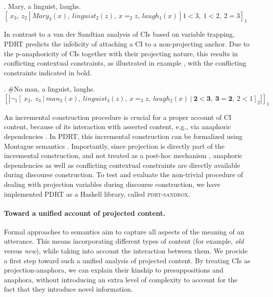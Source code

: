 \documentclass[letterpaper,11pt]{article}
\begin{document}
\vspace{-0.25cm}
\ex.  Mary, a linguist, laughs.\\
{\small 
  $[~x_3,~z_2~
   |~Mary_3(x),~linguist_2(z),~x=_2z,~laugh_1(x)~
 |~1 < 3,~1 < 2,~2=3]_1$
}

\vspace{-0.25cm}
\noindent In contrast to a van der Sandtian analysis of CIs
based on variable trapping, PDRT predicts the infelicity of attaching a CI
to a non-projecting anchor. Due to the p-anaphoricity of CIs together with
their projecting nature, this results in conflicting contextual constraints,
as illustrated in example \Next, with the conflicting constraints
indicated in bold.

\vspace{-0.25cm}
\ex. \#No man, a linguist, laughs.\\
{\small 
  $[|\neg_1[~x_2,~z_3~
   |~man_2(x),~linguist_3(z),~x=_3z,~laugh_2(x)~
   |{\mathbf{~2 < 3,~3 = 2}},~2 < 1]_2|]_1$
}

\vspace{-0.25cm} 
\noindent An incremental construction procedure is crucial
for a proper account of CI content, because of its interaction with asserted
content, e.g., via anaphoric dependencies \citep{anderbois2010crossing}.  In
PDRT, this incremental construction can be formalized using Montague
semantics \citep[cf.][]{muskens1996combining}.  Importantly, since
projection is directly part of the incremental construction, and not treated
as a post-hoc mechanism \citep[as in][]{sandt1992presupposition-short},
anaphoric dependencies as well as conflicting contextual constraints are
directly available during discourse construction. To test and evaluate the
non-trivial procedure of dealing with projection variables during discourse
construction, we have implemented PDRT as a Haskell library, called
\textsc{pdrt-sandbox}.


\paragraph{Toward a unified account of projected content.} Formal approaches
to semantics aim to capture all aspects of the meaning of an utterance. This
means incorporating different types of content (for example, \emph{old}
versus \emph{new}), while taking into account the interaction between them.
We provide a first step toward such a unified analysis of projected content.
By treating CIs as projection-anaphora, we can explain their kinship to
presuppositions and anaphora, without introducing an extra level of
complexity to account for the fact that they introduce novel information.

\small
\vspace{0.4cm}
 
 
\end{document}
